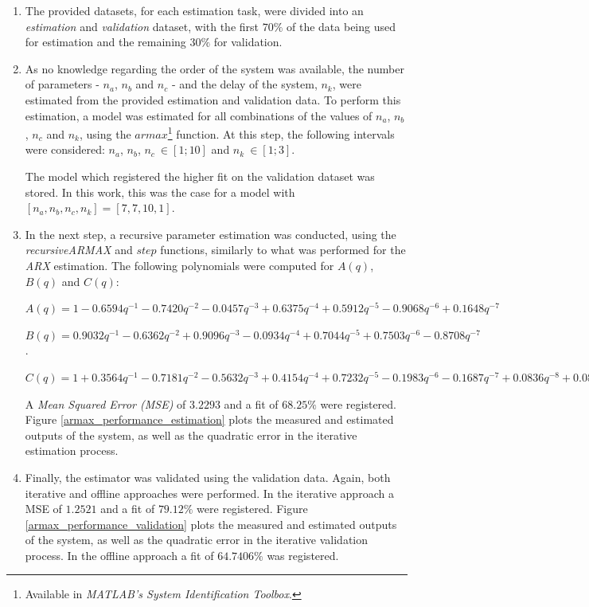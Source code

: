 \documentclass[11pt]{article}
\begin{document}
\begin{enumerate}
	\item The provided datasets, for each estimation task, were divided into an \emph{estimation} and \emph{validation} dataset, with the first $70\%$ of the data being used for estimation and the remaining $30\%$ for validation.
	
	\item As no knowledge regarding the order of the system was available, the number of parameters - $n_{a}$, $n_{b}$ and $n_{c}$ - and the delay of the system, $n_{k}$, were estimated from the provided estimation and validation data. To perform this estimation, a model was estimated for all combinations of the values of $n_{a}$, $n_{b}$, $n_{c}$ and $n_{k}$, using the $armax$\footnote{Available in \emph{MATLAB's System Identification Toolbox}.} function. At this step, the following intervals were considered: $n_{a}$, $n_{b}$, $n_{c} \: \in [1; 10]$ and $n_{k} \: \in [1; 3]$.
	
	The model which registered the higher fit on the validation dataset was stored. In this work, this was the case for a model with $[n_{a}, n_{b}, n_{c}, n_{k}] = [7, 7, 10, 1]$.
	
	\item In the next step, a recursive parameter estimation was conducted, using the \emph{recursiveARMAX} and $step$ functions\footnotemark[\value{footnote}], similarly to what was performed for the \emph{ARX} estimation. The following polynomials were computed for $A(q)$, $B(q)$ and $C(q)$:
	
	$A(q) = 1 -0.6594 q^{-1} - 0.7420 q^{-2} -0.0457 q^{-3} + 0.6375 q^{-4} + 0.5912 q^{-5} -0.9068 q^{-6} + 0.1648 q^{-7} $
	
	$B(q) = 0.9032 q^{-1} -0.6362 q^{-2} + 0.9096 q^{-3} -0.0934 q^{-4} + 0.7044 q^{-5} + 0.7503 q^{-6} -0.8708 q^{-7}$.
	
	$C(q) = 1 + 0.3564 q^{-1} -0.7181 q^{-2} -0.5632 q^{-3} + 0.4154 q^{-4} + 0.7232 q^{-5} -0.1983 q^{-6} -0.1687 q^{-7} + 0.0836 q^{-8} + 0.0836 q^{-9} + 0.0139 q^{-10}$ 
	
	A \emph{Mean Squared Error (MSE)} of $3.2293$ and a fit of $68.25\%$ were registered. Figure \ref{armax_performance_estimation} plots the measured and estimated outputs of the system, as well as the quadratic error in the iterative estimation process.
	
	\item Finally, the estimator was validated using the validation data. Again, both iterative and offline approaches were performed. In the iterative approach a MSE of $1.2521$ and a fit of $79.12\%$ were registered. Figure \ref{armax_performance_validation} plots the measured and estimated outputs of the system, as well as the quadratic error in the iterative validation process. In the offline approach a fit of $64.7406\%$ was registered.
\end{enumerate}
\end{document}
